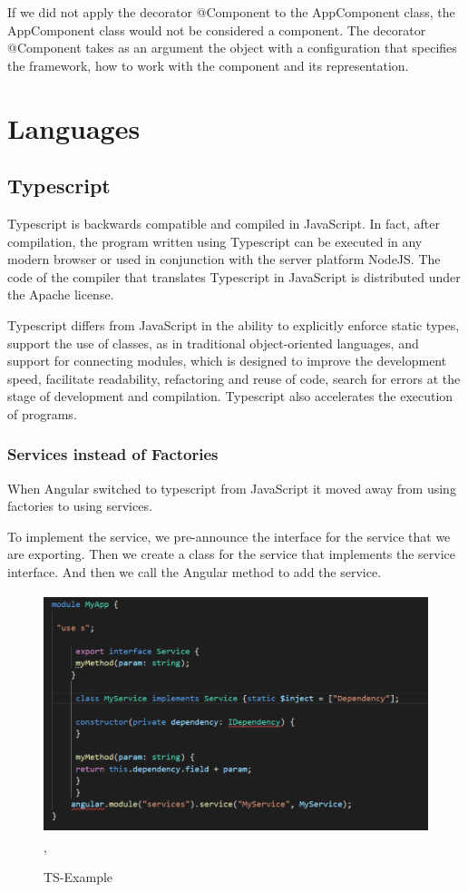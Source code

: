 \documentclass[12pt,a4paper,oneside,openany]{book}
\begin{document}
If we did not apply the decorator @Component to the AppComponent class, the AppComponent class would not be considered a component.
The decorator @Component takes as an argument the object with a configuration that specifies the framework, how to work with the component and its representation.

\section{Languages}
\subsection{Typescript}
Typescript is backwards compatible and compiled in JavaScript. In fact, after compilation, the program written using Typescript can be executed in any modern browser or used in conjunction with the server platform NodeJS.
The code of the compiler that translates Typescript in JavaScript is distributed under the Apache license.

Typescript differs from JavaScript in the ability to explicitly enforce static types, support the use of classes, as in traditional object-oriented languages, and support for connecting modules, which is designed to improve the development speed, facilitate readability, refactoring and reuse of code, search for errors at the stage of development and compilation. Typescript also accelerates the execution of programs. \cite{TS}

\subsubsection{Services instead of Factories}
When Angular switched to typescript from JavaScript it moved away from using factories to using services. 

To implement the service, we pre-announce the interface for the service that we are exporting. Then we create a class for the service that implements the service interface. And then we call the Angular method to add the service. \cite{TS}

\begin{figure}[ht]
\renewcommand\thefigure{4.3}
\centering
\includegraphics[width=12cm, height=7cm]{Images/TS.png},
\caption{TS-Example}
\label{TS}
\end{figure} 
\end{document}
